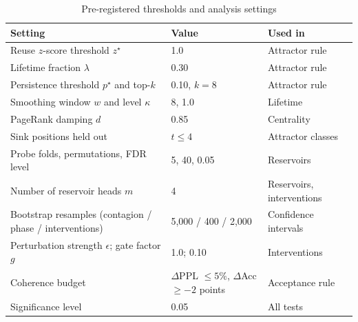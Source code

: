 \begin{table}[htbp]
\centering
\caption{Pre-registered thresholds and analysis settings}\label{tab:thresholds}
\small
\begin{tabularx}{\textwidth}{@{}L{6.4cm}L{2.2cm}Y@{}}
\toprule
\textbf{Setting} & \textbf{Value} & \textbf{Used in} \\
\midrule
Reuse $z$-score threshold $z^\star$ & 1.0 & Attractor rule \\
Lifetime fraction $\lambda$ & 0.30 & Attractor rule \\
Persistence threshold $p^\star$ and top-$k$ & 0.10, $k = 8$ & Attractor rule \\
Smoothing window $w$ and level $\kappa$ & 8, 1.0 & Lifetime \\
PageRank damping $d$ & 0.85 & Centrality \\
Sink positions held out & $t \le 4$ & Attractor classes \\
Probe folds, permutations, FDR level & 5, 40, 0.05 & Reservoirs \\
Number of reservoir heads $m$ & 4 & Reservoirs, interventions \\
Bootstrap resamples (contagion / phase / interventions) & 5,000 / 400 / 2,000 & Confidence intervals \\
Perturbation strength $\epsilon$; gate factor $g$ & 1.0; 0.10 & Interventions \\
Coherence budget & $\Delta$PPL $\le 5\%$, $\Delta$Acc $\ge -2$ points & Acceptance rule \\
Significance level & 0.05 & All tests \\
\bottomrule
\end{tabularx}
\end{table}

